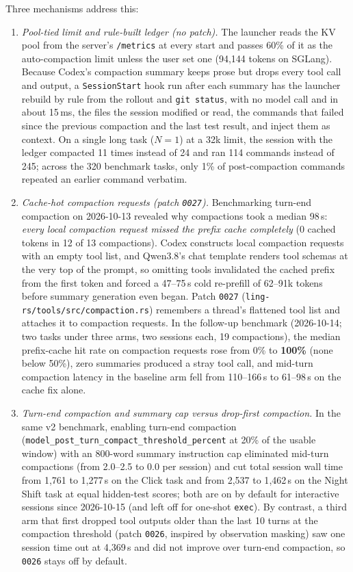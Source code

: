 \documentclass[11pt]{article}
\newcommand{\code}[1]{\texttt{#1}}
\begin{document}
Three mechanisms address this:
\begin{enumerate}
\item \emph{Pool-tied limit and rule-built ledger (no patch).} The launcher reads the KV pool from
the server's \code{/metrics} at every start and passes 60\% of it as the auto-compaction limit
unless the user set one (94{,}144 tokens on SGLang). Because Codex's compaction summary keeps prose
but drops every tool call and output, a \code{SessionStart} hook run after each summary has the
launcher rebuild by rule from the rollout and \code{git status}, with no model call and in about
15\,ms, the files the session modified or read, the commands that failed since the previous
compaction and the last test result, and inject them as context. On a single long task ($N=1$) at a
32k limit, the session with the ledger compacted 11 times instead of 24 and ran 114 commands
instead of 245; across the 320 benchmark tasks, only 1\% of post-compaction commands repeated an
earlier command verbatim.
\item \emph{Cache-hot compaction requests (patch \code{0027}).} Benchmarking turn-end compaction on
2026-10-13 revealed why compactions took a median 98\,s: \emph{every local compaction request missed
the prefix cache completely} (0 cached tokens in 12 of 13 compactions). Codex constructs local
compaction requests with an empty tool list, and Qwen3.8's chat template renders tool schemas at
the very top of the prompt, so omitting tools invalidated the cached prefix from the first token and
forced a 47--75\,s cold re-prefill of 62--91k tokens before summary generation even began. Patch
\code{0027} (\code{ling-rs/tools/src/compaction.rs}) remembers a thread's flattened tool list and
attaches it to compaction requests. In the follow-up benchmark (2026-10-14; two tasks under three arms,
two sessions each, 19 compactions), the median prefix-cache hit rate on compaction requests rose from 0\% to
\textbf{100\%} (none below 50\%), zero summaries produced a stray tool call, and mid-turn
compaction latency in the baseline arm fell from 110--166\,s to 61--98\,s on the cache fix alone.
\item \emph{Turn-end compaction and summary cap versus drop-first compaction.} In the same v2
benchmark, enabling turn-end compaction (\code{model\_post\_turn\_compact\_threshold\_percent} at
20\% of the usable window) with an 800-word summary instruction cap eliminated mid-turn compactions
(from 2.0--2.5 to 0.0 per session) and cut total session wall time from 1{,}761 to 1{,}277\,s on the
Click task and from 2{,}537 to 1{,}462\,s on the Night Shift task at equal hidden-test scores; both
are on by default for interactive sessions since 2026-10-15 (and left off for one-shot \code{exec}).
By contrast, a third arm that first dropped tool outputs older than the last 10 turns at the
compaction threshold (patch \code{0026}, inspired by observation masking) saw one session time out
at 4{,}369\,s and did not improve over turn-end compaction, so \code{0026} stays off by default.
\end{enumerate}
\end{document}
